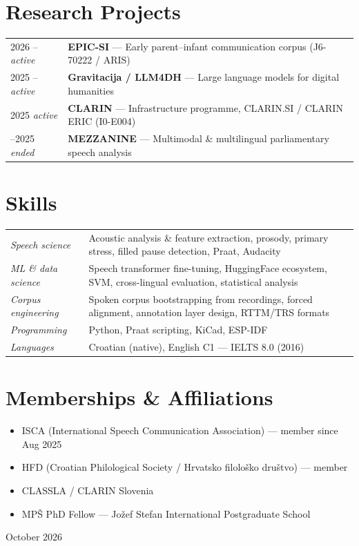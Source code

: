 \documentclass[10pt, a4paper]{article}
\newcommand{\entry}[2]{#1 & #2 \\[2pt]}
\begin{document}
\section{Research Projects}
\begin{tabular}{@{} P{3cm} P{13cm} @{}}
  \entry{2026 – \hfill\textit{active}}
        {\textbf{EPIC-SI} — Early parent–infant communication corpus (J6-70222 / ARIS)}
  \entry{2025 – \hfill\textit{active}}
        {\textbf{Gravitacija / LLM4DH} — Large language models for digital humanities}
  \entry{2025 \hfill\textit{active}}
        {\textbf{CLARIN} — Infrastructure programme, CLARIN.SI / CLARIN ERIC (I0-E004)}
  \entry{–2025 \hfill\textit{ended}}
        {\textbf{MEZZANINE} — Multimodal \& multilingual parliamentary speech analysis}
\end{tabular}

\section{Skills}
\begin{tabular}{@{} P{3.8cm} P{12.2cm} @{}}
  \textit{Speech science} &
    Acoustic analysis \& feature extraction, prosody, primary stress, filled pause
    detection, Praat, Audacity \\[2pt]
  \textit{ML \& data science} &
    Speech transformer fine-tuning, HuggingFace ecosystem, SVM, cross-lingual evaluation,
    statistical analysis \\[2pt]
  \textit{Corpus engineering} &
    Spoken corpus bootstrapping from recordings, forced alignment, annotation layer design,
    RTTM/TRS formats \\[2pt]
  \textit{Programming} & Python, Praat scripting, KiCad, ESP-IDF \\[2pt]
  \textit{Languages} & Croatian (native), English C1 — IELTS 8.0 (2016) \\
\end{tabular}

\section{Memberships \& Affiliations}
\begin{itemize}
  \item ISCA (International Speech Communication Association) — member since Aug 2025
  \item HFD (Croatian Philological Society / Hrvatsko filološko društvo) — member
  \item CLASSLA / CLARIN Slovenia
  \item MPŠ PhD Fellow — Jožef Stefan International Postgraduate School
\end{itemize}

\vfill
{\small\color{gray} \raggedleft October 2026}
\end{document}
